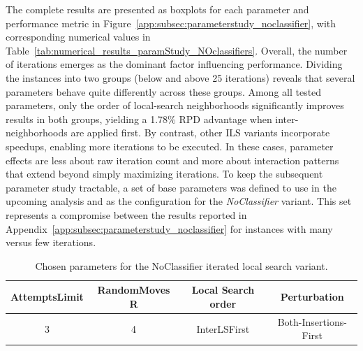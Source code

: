 The complete results are presented as boxplots for each parameter and performance metric in Figure~\ref{app:subsec:parameterstudy_noclassifier},
with corresponding numerical values in Table~\ref{tab:numerical_results_paramStudy_NOclassifiers}. Overall, the number of
iterations emerges as the dominant factor influencing performance. Dividing the instances into two groups (below and above 25 iterations)
reveals that several parameters behave quite differently across these groups.
Among all tested parameters, only the order of local-search neighborhoods significantly improves results in both groups, yielding a
1.78\% \gls{RPD} advantage when inter-neighborhoods are applied first. By contrast, other \gls{ILS} variants incorporate speedups,
enabling more iterations to be executed. In these cases, parameter effects are less about raw iteration count and more about
interaction patterns that extend beyond simply maximizing iterations. To keep the subsequent parameter study tractable,
a set of base parameters was defined to use in the upcoming analysis and as the configuration for the \textit{NoClassifier} variant.
This set represents a compromise between the results reported in Appendix~\ref{app:subsec:parameterstudy_noclassifier} for instances with
many versus few iterations.

\begin{table}[ht]
	\centering
	\small
	\begin{tabular}{@{}cccc@{}}
		\toprule
		AttemptsLimit & RandomMoves        R & Local Search order & Perturbation          \\
		\midrule
		3             & 4                    & InterLSFirst       & Both-Insertions-First \\
		\bottomrule
	\end{tabular}
	\caption{Chosen parameters for the NoClassifier iterated local search variant.}
	\label{tab:parameters_final_noclassifier}
\end{table}

